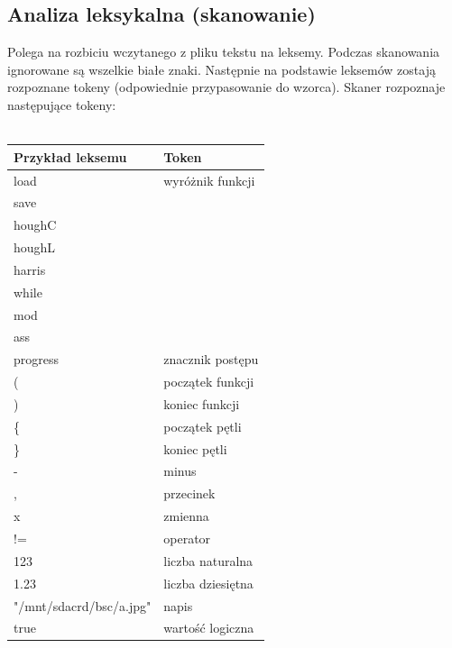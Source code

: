 \documentclass[11pt,a4paper]{article}
\begin{document}
\subsection{Analiza leksykalna (skanowanie)}
Polega na rozbiciu wczytanego z pliku tekstu na leksemy. Podczas skanowania ignorowane są wszelkie białe znaki. Następnie na podstawie leksemów zostają rozpoznane tokeny (odpowiednie przypasowanie do wzorca). Skaner rozpoznaje następujące tokeny:\\\\
\begin{tabular}{ | l | l | }
\hline                        
\bf{Przykład leksemu} & \bf{Token} \\\hline        
load & wyróżnik funkcji \\
save&\\
houghC&\\
houghL&\\
harris&\\
while&\\
mod&\\
ass&\\\hline
progress& znacznik postępu\\\hline
( & początek funkcji\\\hline
) & koniec funkcji\\\hline
\{ & początek pętli \\\hline
\} & koniec pętli \\\hline
- & minus \\\hline
, & przecinek\\\hline
x & zmienna\\\hline
!= & operator\\\hline
123 & liczba naturalna\\\hline
1.23 & liczba dziesiętna\\\hline
"/mnt/sdacrd/bsc/a.jpg" & napis\\\hline
true & wartość logiczna\\\hline
\end{tabular}
\\\\\\
\end{document}
